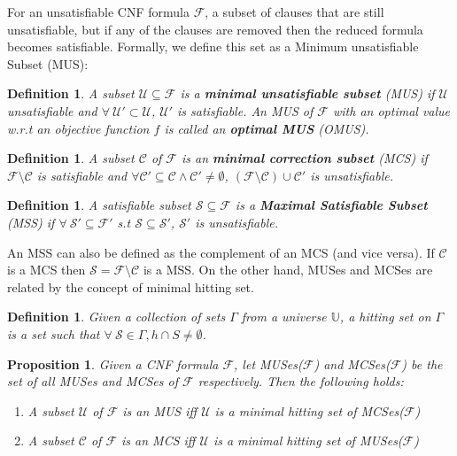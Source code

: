 \documentclass{article}
\newcommand\m[1]{\mathcal{#1}}
\newtheorem{definition}[thm]{Definition}
\newtheorem{proposition}[propo]{Proposition}
\begin{document}
For an unsatisfiable CNF formula $\m{F}$, a subset of clauses that are still unsatisfiable, but if any of the clauses are removed then the reduced formula becomes satisfiable. 
Formally, we define this set as a Minimum unsatisfiable Subset (MUS):

\begin{definition}
  A subset $\m{U} \subseteq \m{F}$ is a \textbf{minimal unsatisfiable subset} (MUS) if $\m{U}$ \emph{unsatisfiable} and $\forall \ \m{U}' \subset \m{U}$, $\m{U}'$ is \emph{satisfiable}. An MUS of $\m{F}$ with an optimal value w.r.t an \emph{objective function $f$} is called an \textbf{optimal MUS} (OMUS).
\end{definition}

\begin{definition}
  A subset $\m{C}$ of $\m{F}$ is an \textbf{minimal correction subset} (MCS) if $\m{F}  \setminus \m{C}$ is \emph{satisfiable} and $\forall \m{C}' \subseteq \m{C} \wedge \m{C}' \neq \emptyset$, $(\m{F} \setminus \m{C}) \cup \m{C}'$ is \emph{unsatisfiable}.
\end{definition}

\begin{definition}
  A \emph{satisfiable subset} $\m{S} \subseteq \m{F}$ is a \textbf{Maximal Satisfiable Subset} (MSS) if  $\forall \ \m{S}' \subseteq \m{F}'$ s.t $ \m{S} \subseteq \m{S}'$, $\m{S}'$ is \emph{unsatisfiable}.
\end{definition}

An MSS can also be defined as the complement of an MCS (and vice versa). If $\m{C}$ is a MCS then $ \m{S} = \m{F} \setminus \m{C}$ is a MSS. On the other hand, MUSes and MCSes are related by the concept of minimal hitting set.

\begin{definition}
  Given a collection of sets $\Gamma$ from a universe $\mathbb{U}$, a hitting set on $\Gamma$ is a set such that $\forall \ \m{S} \in \Gamma, h \cap S \neq \emptyset$.
\end{definition}

\begin{proposition}\label{prop:duality_MCS_MUS}
  Given a CNF formula $\m{F}$, let MUSes($\m{F}$) and MCSes($\m{F}$) be the set of all MUSes and MCSes of $\m{F}$ respectively. Then the following holds:
  \begin{enumerate}
    \item A subset $\m{U}$ of $\m{F}$ is an MUS iff $\m{U}$ is a minimal hitting set of MCSes($\m{F}$)
    \item A subset $\m{C}$ of $\m{F}$ is an MCS iff $\m{U}$ is a minimal hitting set of MUSes($\m{F}$)
  \end{enumerate}
\end{proposition}
\end{document}
